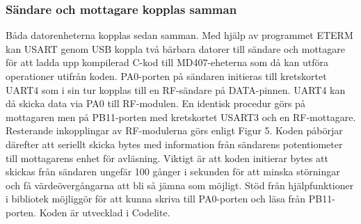 \documentclass[a4paper]{article}
\begin{document}
\subsubsection{Sändare och mottagare kopplas samman}
\vspace{5mm} \noindent
Båda datorenheterna kopplas sedan samman. Med hjälp av programmet ETERM kan USART genom USB koppla två bärbara datorer till sändare och mottagare för att ladda upp kompilerad C-kod till MD407-eheterna som då kan utföra operationer utifrån koden. PA0-porten på sändaren initieras till kretskortet UART4 som i sin tur kopplas till en RF-sändare på DATA-pinnen. UART4 kan då skicka data via PA0 till RF-modulen. En identisk procedur görs på mottagaren men på PB11-porten med kretskortet USART3 och en RF-mottagare. Resterande inkopplingar av RF-modulerna görs enligt Figur 5. Koden påbörjar därefter att seriellt skicka bytes med information från sändarens potentiometer till mottagarens enhet för avläsning. Viktigt är att koden initierar bytes att skickas från sändaren ungefär 100 gånger i sekunden för att minska störningar och få värdeövergångarna att bli så jämna som möjligt. Stöd från hjälpfunktioner i bibliotek möjliggör för att kunna skriva till PA0-porten och läsa från PB11-porten. Koden är utvecklad i Codelite.
\end{document}
